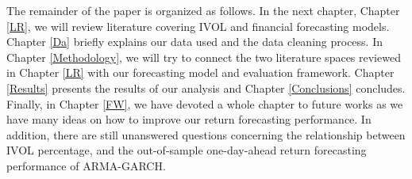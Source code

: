 The remainder of the paper is organized as follows. In the next chapter, Chapter \ref{LR}, we will review literature covering IVOL and financial forecasting models. Chapter \ref{Da} briefly explains our data used and the data cleaning process. In Chapter \ref{Methodology}, we will try to connect the two literature spaces reviewed in Chapter \ref{LR} with our forecasting model and evaluation framework. Chapter \ref{Results} presents the results of our analysis and Chapter \ref{Conclusions} concludes. Finally, in Chapter \ref{FW}, we have devoted a whole chapter to future works as we have many ideas on how to improve our return forecasting performance. In addition, there are still unanswered questions concerning the relationship between IVOL percentage, and the out-of-sample one-day-ahead return forecasting performance of ARMA-GARCH.

